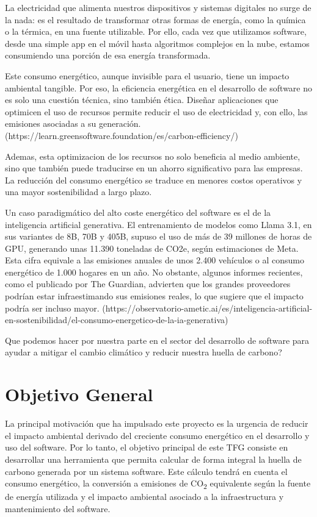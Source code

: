 \documentclass[12pt,a4paper]{report}
\begin{document}
La electricidad que alimenta nuestros dispositivos y sistemas digitales no surge de la nada: es el resultado de transformar otras formas de energía, como la química o la térmica, en una fuente utilizable. Por 
ello, cada vez que utilizamos software, desde una simple app en el móvil hasta algoritmos complejos en la nube, estamos consumiendo una porción de esa energía transformada.

Este consumo energético, aunque invisible para el usuario, tiene un impacto ambiental tangible. Por eso, la eficiencia energética en el desarrollo de software no es solo una cuestión técnica, sino también ética. 
Diseñar aplicaciones que optimicen el uso de recursos permite reducir el uso de electricidad y, con ello, las emisiones asociadas a su generación. (https://learn.greensoftware.foundation/es/carbon-efficiency/)

Ademas, esta optimizacion de los recursos no solo beneficia al medio ambiente, sino que también puede traducirse en un ahorro significativo para las empresas. La reducción del consumo energético se traduce en 
menores costos operativos y una mayor sostenibilidad a largo plazo.

Un caso paradigmático del alto coste energético del software es el de la inteligencia artificial generativa. El entrenamiento de modelos como Llama 3.1, en sus variantes de 8B, 70B y 405B, supuso el uso de más de 
39 millones de horas de GPU, generando unas 11.390 toneladas de CO2e, según estimaciones de Meta. Esta cifra equivale a las emisiones anuales de unos 2.400 vehículos o al consumo energético de 1.000 hogares en un 
año. No obstante, algunos informes recientes, como el publicado por The Guardian, advierten que los grandes proveedores podrían estar infraestimando sus emisiones reales, lo que sugiere que el impacto podría ser 
incluso mayor. (https://observatorio-ametic.ai/es/inteligencia-artificial-en-sostenibilidad/el-consumo-energetico-de-la-ia-generativa)

Que podemos hacer por nuestra parte en el sector del desarrollo de software para ayudar a mitigar el cambio climático y reducir nuestra huella de carbono?

\section{Objetivo General}

La principal motivación que ha impulsado este proyecto es la urgencia de reducir el impacto ambiental derivado del creciente consumo energético en el desarrollo y uso del software. Por lo tanto, el objetivo 
principal de este TFG consiste en desarrollar una herramienta que permita calcular de forma integral la huella de carbono generada por un sistema software. Este cálculo tendrá en cuenta el consumo 
energético, la conversión a emisiones de CO\textsubscript{2} equivalente según la fuente de energía utilizada y el impacto ambiental asociado a la infraestructura y mantenimiento del software.
\end{document}

